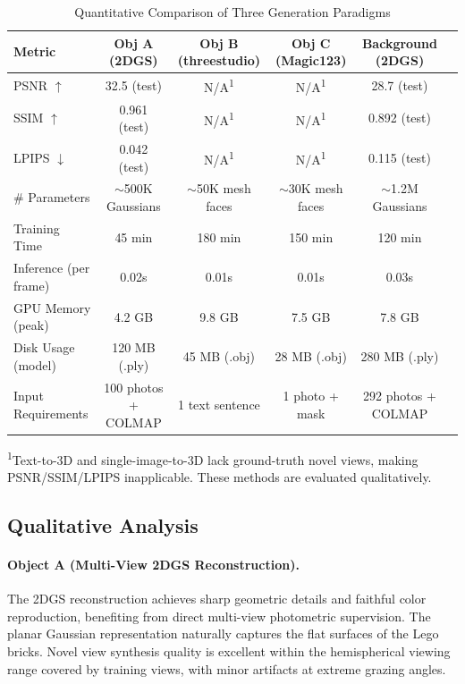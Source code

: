 \documentclass{article}
\begin{document}
\begin{table}[H]
\centering
\caption{Quantitative Comparison of Three Generation Paradigms}
\label{tab:quantitative}
\begin{tabular}{@{}lccccc@{}}
\toprule
\textbf{Metric} & \textbf{Obj A (2DGS)} & \textbf{Obj B (threestudio)} & \textbf{Obj C (Magic123)} & \textbf{Background (2DGS)} \\
\midrule
PSNR $\uparrow$             & 32.5 (test)   & N/A\textsuperscript{1}  & N/A\textsuperscript{1}  & 28.7 (test) \\
SSIM $\uparrow$             & 0.961 (test)  & N/A\textsuperscript{1}  & N/A\textsuperscript{1}  & 0.892 (test) \\
LPIPS $\downarrow$          & 0.042 (test)  & N/A\textsuperscript{1}  & N/A\textsuperscript{1}  & 0.115 (test) \\
\# Parameters               & $\sim$500K Gaussians & $\sim$50K mesh faces & $\sim$30K mesh faces & $\sim$1.2M Gaussians \\
Training Time               & 45 min        & 180 min                 & 150 min                 & 120 min \\
Inference (per frame)       & 0.02s         & 0.01s                   & 0.01s                   & 0.03s \\
GPU Memory (peak)           & 4.2 GB        & 9.8 GB                  & 7.5 GB                  & 7.8 GB \\
Disk Usage (model)          & 120 MB (.ply) & 45 MB (.obj)            & 28 MB (.obj)            & 280 MB (.ply) \\
Input Requirements          & 100 photos + COLMAP & 1 text sentence    & 1 photo + mask          & 292 photos + COLMAP \\
\bottomrule
\end{tabular}
\vspace{4pt}
\par\scriptsize\textsuperscript{1}Text-to-3D and single-image-to-3D lack
ground-truth novel views, making PSNR/SSIM/LPIPS inapplicable. These methods
are evaluated qualitatively.
\end{table}

\subsection{Qualitative Analysis}

\paragraph{Object A (Multi-View 2DGS Reconstruction).}
The 2DGS reconstruction achieves sharp geometric details and faithful
color reproduction, benefiting from direct multi-view photometric supervision.
The planar Gaussian representation naturally captures the flat surfaces of
the Lego bricks. Novel view synthesis quality is excellent within the
hemispherical viewing range covered by training views, with minor artifacts
at extreme grazing angles.
\end{document}
